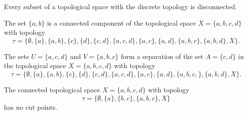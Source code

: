 \item Every subset of a topological space with the discrete topology is disconnected. 

\item The set $\{a,b\}$ is a connected component of the topological space $X = \{a,b,c,d\}$ with topology 
\[\tau = \{\emptyset, \{a\}, \{a,b\}, \{c\}, \{d\}, \{c,d\}, \{a,c,d\}, \{a,c\}, \{a,d\}, \{a,b,c\}, \{a,b,d\}, X\}.\]

\item The sets $U = \{a,c,d\}$ and $V = \{a,b,c\}$ form a separation of the set $A = \{c,d\}$ in the topological space $X = \{a,b,c,d\}$ with topology 
\[\tau = \{\emptyset, \{a\}, \{a,b\}, \{c\}, \{d\}, \{c,d\}, \{a,c,d\}, \{a,c\}, \{a,d\}, \{a,b,c,\}, \{a,b,d\}, X\}.\]

\item The connected topological space $X = \{a,b,c,d\}$ with topology 
\[\tau = \{\emptyset, \{a\}, \{b,c\}, \{a,b,c\}, X\}\]
has no cut points. 
		
	\ea

